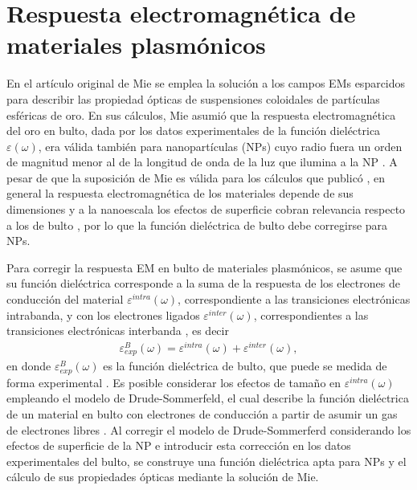 \section{Respuesta electromagnética de materiales plasmónicos}

En el artículo original de Mie \cite{mie1908metallosung} se emplea la solución a los campos EMs esparcidos para describir las propiedad ópticas de suspensiones coloidales de partículas esféricas de oro. En sus cálculos, Mie asumió que la  respuesta electromagnética del oro en bulto, dada por los datos experimentales de la función dieléctrica $\varepsilon(\omega)$, era válida también para nanopartículas (NPs) cuyo radio fuera un orden de magnitud menor al de la longitud de onda de la luz que ilumina a la NP \cite{horvath2009historic}. A pesar de que la suposición de Mie es válida para los cálculos que publicó \cite{horvath2009historic}, en general la respuesta electromagnética de los materiales depende de sus dimensiones y a la nanoescala los efectos de superficie cobran relevancia respecto a los de bulto \cite{boverhof2015comparative}, por lo que la función dieléctrica de bulto debe corregirse para NPs. 

Para corregir la respuesta EM  en bulto de materiales plasmónicos, se asume que su función dieléctrica corresponde a la suma de la respuesta de los electrones de conducción del material  $\varepsilon^{intra}(\omega) $, correspondiente a las transiciones electrónicas intrabanda, y con los electrones ligados  $\varepsilon^{inter}(\omega) $, correspondientes a las transiciones electrónicas interbanda \cite{noguez2007surface}, es decir
	\begin{align*}
	\varepsilon^B_{exp}(\omega) = \varepsilon^{intra}(\omega) + \varepsilon^{inter}(\omega),
	\end{align*}
en donde $\varepsilon^B_{exp}(\omega)$ es la función dieléctrica de bulto, que puede se medida de forma experimental \cite{johnson1972constants}. Es posible considerar los efectos de tamaño en $\varepsilon^{intra}(\omega)$ empleando el modelo de Drude-Sommerfeld, el cual describe la función dieléctrica de un material en bulto con electrones de conducción a partir de asumir un gas de electrones libres \cite{gross2014festkorperphysik}. Al corregir el modelo de Drude-Sommerferd considerando los efectos de superficie de la NP e introducir esta corrección en los datos experimentales del bulto, se construye una función dieléctrica apta para NPs y el cálculo de sus propiedades ópticas mediante la solución de Mie.

